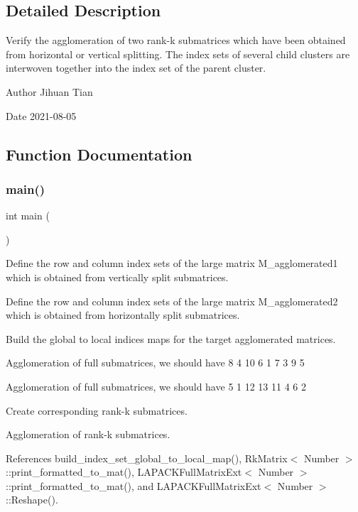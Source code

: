 \subsection{Detailed Description}
Verify the agglomeration of two rank-\/k submatrices which have been obtained from horizontal or vertical splitting. The index sets of several child clusters are interwoven together into the index set of the parent cluster. 

\begin{DoxyAuthor}{Author}
Jihuan Tian 
\end{DoxyAuthor}
\begin{DoxyDate}{Date}
2021-\/08-\/05 
\end{DoxyDate}


\subsection{Function Documentation}
\mbox{\label{rkmatrix-agglomeration-of-two-submatrices-interwoven-indices_8cc_ae66f6b31b5ad750f1fe042a706a4e3d4}} 
\subsubsection{\texorpdfstring{main()}{main()}}
{\footnotesize\ttfamily int main (\begin{DoxyParamCaption}{ }\end{DoxyParamCaption})}

Define the row and column index sets of the large matrix {\ttfamily M\+\_\+agglomerated1} which is obtained from vertically split submatrices.

Define the row and column index sets of the large matrix {\ttfamily M\+\_\+agglomerated2} which is obtained from horizontally split submatrices.

Build the global to local indices maps for the target agglomerated matrices.

Agglomeration of full submatrices, we should have { 8 4 10 6 1 7 3 9 5 }

Agglomeration of full submatrices, we should have { 5 1 12 13 11 4 6 2 }

Create corresponding rank-\/k submatrices.

Agglomeration of rank-\/k submatrices.

References build\+\_\+index\+\_\+set\+\_\+global\+\_\+to\+\_\+local\+\_\+map(), Rk\+Matrix$<$ Number $>$\+::print\+\_\+formatted\+\_\+to\+\_\+mat(), L\+A\+P\+A\+C\+K\+Full\+Matrix\+Ext$<$ Number $>$\+::print\+\_\+formatted\+\_\+to\+\_\+mat(), and L\+A\+P\+A\+C\+K\+Full\+Matrix\+Ext$<$ Number $>$\+::\+Reshape().


